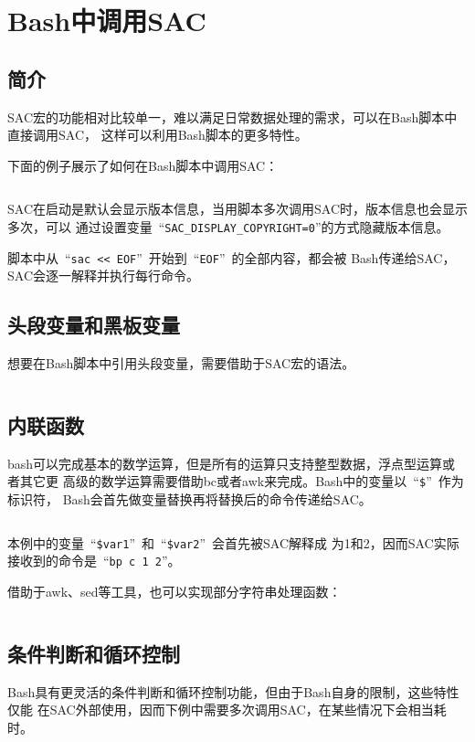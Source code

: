 \section{Bash中调用SAC}
\label{sec:sac-bash}

\subsection{简介}
SAC宏的功能相对比较单一，难以满足日常数据处理的需求，可以在Bash脚本中直接调用SAC，
这样可以利用Bash脚本的更多特性。

下面的例子展示了如何在Bash脚本中调用SAC：
\inputminted{bash}{./call-in-script/simple-script.sh}

SAC在启动是默认会显示版本信息，当用脚本多次调用SAC时，版本信息也会显示多次，可以
通过设置变量~``\lstinline{SAC_DISPLAY_COPYRIGHT=0}''的方式隐藏版本信息。

脚本中从~``\lstinline{sac << EOF}''~开始到~``\lstinline{EOF}''~的全部内容，都会被
Bash传递给SAC，SAC会逐一解释并执行每行命令。

\subsection{头段变量和黑板变量}
想要在Bash脚本中引用头段变量，需要借助于SAC宏的语法。
\inputminted{bash}{./call-in-script/variables.sh}

\subsection{内联函数}
bash可以完成基本的数学运算，但是所有的运算只支持整型数据，浮点型运算或者其它更
高级的数学运算需要借助bc或者awk来完成。Bash中的变量以~``\lstinline{$}''~作为标识符，
Bash会首先做变量替换再将替换后的命令传递给SAC。
\inputminted{bash}{./call-in-script/arithmetic-functions.sh}

本例中的变量~``\lstinline{$var1}''~和~``\lstinline{$var2}''~会首先被SAC解释成
为1和2，因而SAC实际接收到的命令是~``\lstinline{bp c 1 2}''。

借助于awk、sed等工具，也可以实现部分字符串处理函数：
\inputminted{bash}{./call-in-script/string-functions.sh}

\subsection{条件判断和循环控制}
Bash具有更灵活的条件判断和循环控制功能，但由于Bash自身的限制，这些特性仅能
在SAC外部使用，因而下例中需要多次调用SAC，在某些情况下会相当耗时。
\inputminted{bash}{./call-in-script/do-loops.sh}
